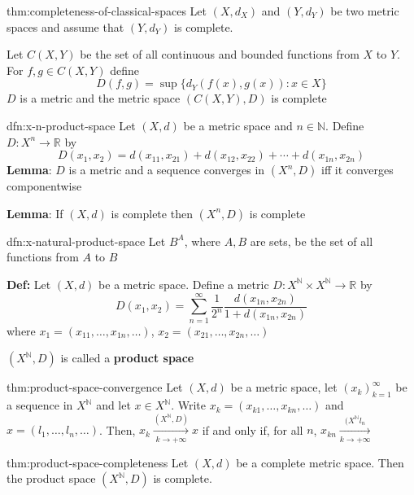 \documentclass[landscape, 8pt]{extarticle}
\begin{document}
\begin{multicols}{3}
\begin{thm}{thm:completeness-of-classical-spaces}{}
    Let $(X, d_{X})$ and $(Y, d_{Y})$ be two metric spaces and assume that $(Y, d_{Y})$ is complete.

    Let $C(X, Y)$ be the set of all continuous and bounded functions from $X$ to $Y$. For $f, g\in C(X, Y)$ define
    \[D(f, g) = \sup \{d_{Y}(f(x), g(x)) : x\in X\}\]
    $D$ is a metric and the metric space $(C(X, Y), D)$ is complete
\end{thm}

\begin{dfn}{dfn:x-n-product-space}{}
    Let $(X, d)$ be a metric space and $n\in \mathbb{N}$. Define $D : X^{n} \to \mathbb{R}$ by
    \[D(x_{1}, x_{2}) = d(x_{11}, x_{21}) + d(x_{12}, x_{22}) + \cdots + d(x_{1n}, x_{2n})\]
    \textbf{Lemma}: $D$ is a metric and a sequence converges in $(X^{n}, D)$ iff it converges componentwise

    \textbf{Lemma}: If $(X, d)$ is complete then $(X^{n}, D)$ is complete
\end{dfn}

\begin{dfn}{dfn:x-natural-product-space}{}
    Let $B^{A}$, where $A, B$ are sets, be the set of all functions from $A$ to $B$

    \longrule{0.08ex}
    \textbf{Def:} Let $(X, d)$ be a metric space. Define a metric $D : X^{\mathbb{N}} \times X^{\mathbb{N}} \to \mathbb{R}$ by
    \[D(x_{1}, x_{2}) = \sum_{n = 1}^{\infty} \frac{1}{2^{n}} \frac{d(x_{1n}, x_{2n})}{1 + d(x_{1n}, x_{2n})}\]
    where $x_{1} = (x_{11},\dots, x_{1n},\dots)$, $x_{2} = (x_{21},\dots,x_{2n},\dots)$

    $(X^{\mathbb{N}}, D)$ is called a \textbf{product space}

\end{dfn}

\begin{thm}{thm:product-space-convergence}{}
    Let $(X, d)$ be a metric space, let $(x_{k})_{k=1}^{\infty}$ be a sequence in $X^{\mathbb{N}}$ and let $x\in X^{\mathbb{N}}$. Write $x_{k} = (x_{k 1},\dots, x_{kn},\dots)$ and $x = (l_{1},\dots,l_{n},\dots)$. Then, $x_{k} \xrightarrow[k \to +\infty]{(X^{\mathbb{N}}, D)} x$ if and only if, for all $n$, $x_{kn}\xrightarrow[k \to +\infty]{(X^{\mathbb{N}} l_{n}}$
\end{thm}

\begin{thm}{thm:product-space-completeness}{}
    Let $(X, d)$ be a complete metric space. Then the product space $(X^{\mathbb{N}}, D)$ is complete.
\end{thm}


\end{multicols}
\end{document}
